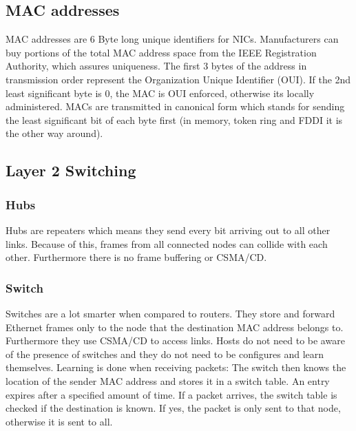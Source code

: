 \subsection{MAC addresses}
MAC addresses are 6 Byte long unique identifiers for NICs.
Manufacturers can buy portions of the total MAC address space from the IEEE Registration Authority, which assures uniqueness.
The first 3 bytes of the address in transmission order represent the Organization Unique Identifier (OUI).
If the 2nd least significant byte is 0, the MAC is OUI enforced, otherwise its locally administered.
MACs are transmitted in canonical form which stands for sending the least significant bit of each byte first (in memory, token ring and FDDI it is the other way around).

\subsection{Layer 2 Switching}
\subsubsection*{Hubs}
Hubs are repeaters which means they send every bit arriving out to all other links.
Because of this, frames from all connected nodes can collide with each other.
Furthermore there is no frame buffering or CSMA/CD.

\subsubsection*{Switch}
Switches are a lot smarter when compared to routers.
They store and forward Ethernet frames only to the node that the destination MAC address belongs to.
Furthermore they use CSMA/CD to access links.
Hosts do not need to be aware of the presence of switches and they do not need to be configures and learn themselves.
Learning is done when receiving packets: The switch then knows the location of the sender MAC address and stores it in a switch table.
An entry expires after a specified amount of time.
If a packet arrives, the switch table is checked if the destination is known.
If yes, the packet is only sent to that node, otherwise it is sent to all.


